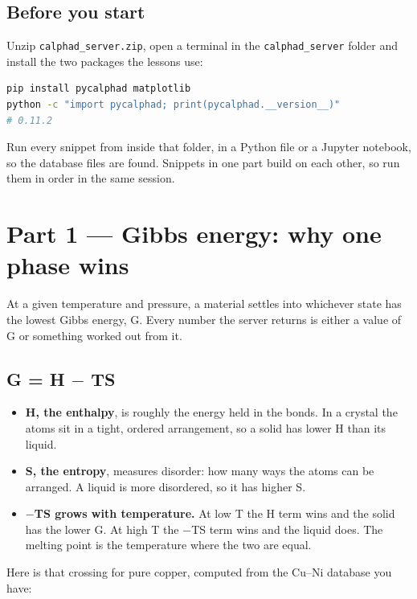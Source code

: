 \documentclass[12pt,a4paper]{article}
\begin{document}
\subsection*{Before you start}
Unzip \texttt{calphad\_\allowbreak{}server.\allowbreak{}zip}, open a terminal in the \texttt{calphad\_\allowbreak{}server} folder and install the two packages the lessons use:

\begin{lstlisting}[basicstyle={\footnotesize\ttfamily},language=bash]
pip install pycalphad matplotlib
python -c "import pycalphad; print(pycalphad.__version__)"
# 0.11.2
\end{lstlisting}
Run every snippet from inside that folder, in a Python file or a Jupyter notebook, so the database files are found. Snippets in one part build on each other, so run them in order in the same session.


\section*{Part 1 --- Gibbs energy: why one phase wins}
At a given temperature and pressure, a material settles into whichever state has the lowest Gibbs energy, G. Every number the server returns is either a value of G or something worked out from it.


\subsection*{G = H \texorpdfstring{\(-\)}{-} TS}
\begin{itemize}
\item \textbf{H, the enthalpy}, is roughly the energy held in the bonds. In a crystal the atoms sit in a tight, ordered arrangement, so a solid has lower H than its liquid.
\item \textbf{S, the entropy}, measures disorder: how many ways the atoms can be arranged. A liquid is more disordered, so it has higher S.
\item \textbf{\(-\)TS grows with temperature.} At low T the H term wins and the solid has the lower G. At high T the \(-\)TS term wins and the liquid does. The melting point is the temperature where the two are equal.
\end{itemize}
Here is that crossing for pure copper, computed from the Cu--Ni database you have:
\end{document}
